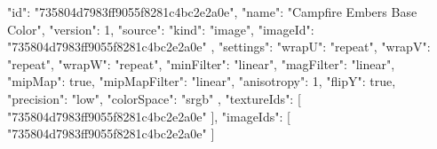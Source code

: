 {
  "id": "735804d7983ff9055f8281c4bc2e2a0e",
  "name": "Campfire Embers Base Color",
  "version": 1,
  "source": {
    "kind": "image",
    "imageId": "735804d7983ff9055f8281c4bc2e2a0e"
  },
  "settings": {
    "wrapU": "repeat",
    "wrapV": "repeat",
    "wrapW": "repeat",
    "minFilter": "linear",
    "magFilter": "linear",
    "mipMap": true,
    "mipMapFilter": "linear",
    "anisotropy": 1,
    "flipY": true,
    "precision": "low",
    "colorSpace": "srgb"
  },
  "textureIds": [
    "735804d7983ff9055f8281c4bc2e2a0e"
  ],
  "imageIds": [
    "735804d7983ff9055f8281c4bc2e2a0e"
  ]
}
